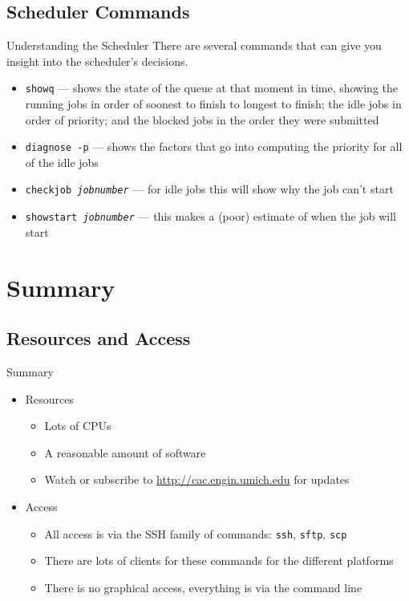 \documentclass{beamer}
\begin{document}
\subsection{Scheduler Commands}
\begin{frame}{Understanding the Scheduler}
There are several commands that can give you insight into the scheduler's
decisions.
\begin{itemize}
\item \texttt{showq} --- shows the state of the queue at that moment in time,
showing the running jobs in order of soonest to finish to longest to finish; the
idle jobs in order of priority; and the blocked jobs in the order they were
submitted
\item \texttt{diagnose -p} --- shows the factors that go into computing the
priority for all of the idle jobs
\item \texttt{checkjob \textit{jobnumber}} --- for idle jobs this will show why
the job can't start
\item \texttt{showstart \textit{jobnumber}} --- this makes a (poor) estimate of
when the job will start
\end{itemize}
\end{frame}
\section{Summary}
\subsection{Resources and Access}
\begin{frame}{Summary}
 \begin{itemize}
  \item Resources
   \begin{itemize}
    \item Lots of CPUs
    \item A reasonable amount of software
    \item Watch or subscribe to \url{http://cac.engin.umich.edu} for updates
   \end{itemize}
   \item Access
    \begin{itemize}
     \item All access is via the SSH family of commands: \texttt{ssh},
\texttt{sftp}, \texttt{scp}
     \item There are lots of clients for these commands for the different
platforms
     \item There is no graphical access, everything is via the command line
    \end{itemize}
 \end{itemize}
\end{frame}
\end{document}
